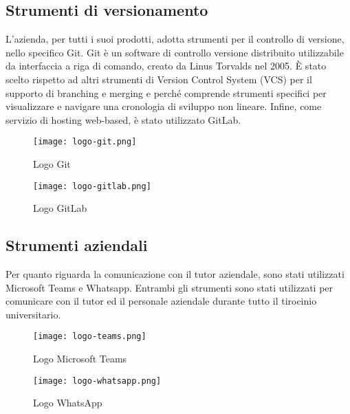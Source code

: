 \subsection{Strumenti di versionamento}

L’azienda, per tutti i suoi prodotti, adotta strumenti per il controllo di versione, nello specifico Git. Git è un software di controllo versione distribuito utilizzabile da interfaccia a riga di comando, creato da Linus Torvalds nel 2005. È stato scelto rispetto ad altri strumenti di Version Control System (VCS) per il supporto di branching e merging e perché comprende strumenti specifici per visualizzare e navigare una cronologia di sviluppo non lineare. Infine, come servizio di hosting web-based, è stato utilizzato GitLab.

\begin{figure}[!h]
    \begin{minipage}{.5\textwidth} 
        \centering 
        \texttt{[image: logo-git.png]} 
        \caption{Logo Git} 
        \label{fig:git} 
    \end{minipage}%
    \begin{minipage}{.5\textwidth} 
        \centering 
        \texttt{[image: logo-gitlab.png]} 
        \caption{Logo GitLab} 
        \label{fig:gitlab} 
    \end{minipage}  
\end{figure}

\subsection{Strumenti aziendali}

Per quanto riguarda la comunicazione con il tutor aziendale, sono stati utilizzati Microsoft Teams e Whatsapp. Entrambi gli strumenti sono stati utilizzati per comunicare con il tutor ed il personale aziendale durante tutto il tirocinio universitario.

\begin{figure}[!h]
    \begin{minipage}{.5\textwidth} 
        \centering 
        \texttt{[image: logo-teams.png]} 
        \caption{Logo Microsoft Teams} 
        \label{fig:teams} 
    \end{minipage}%
    \begin{minipage}{.5\textwidth} 
        \centering 
        \texttt{[image: logo-whatsapp.png]} 
        \caption{Logo WhatsApp} 
        \label{fig:whatsapp} 
    \end{minipage}  
\end{figure}

